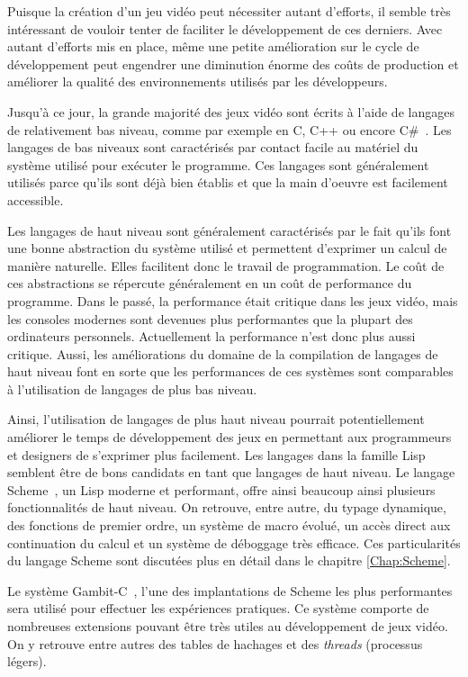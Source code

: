 \documentclass[12pt,oneside,letterpaper,francais]{book}
\begin{document}
Puisque la création d'un jeu vidéo peut nécessiter autant d'efforts,
il semble très intéressant de vouloir tenter de faciliter le
développement de ces derniers. Avec autant d'efforts mis en place,
même une petite amélioration sur le cycle de développement peut
engendrer une diminution énorme des coûts de production et améliorer
la qualité des environnements utilisés par les développeurs.

Jusqu'à ce jour, la grande majorité des jeux vidéo sont écrits à
l'aide de langages de relativement bas niveau, comme par exemple en C,
C++ ou encore C\#~\cite{CSHARP_SPEC}. Les langages de bas niveaux sont
caractérisés par contact facile au matériel du système utilisé pour
exécuter le programme. Ces langages sont généralement utilisés parce
qu'ils sont déjà bien établis et que la main d'oeuvre est facilement
accessible.

Les langages de haut niveau sont généralement caractérisés par le fait
qu'ils font une bonne abstraction du système utilisé et permettent
d'exprimer un calcul de manière naturelle. Elles facilitent donc le
travail de programmation. Le coût de ces abstractions se répercute
généralement en un coût de performance du programme. Dans le passé, la
performance était critique dans les jeux vidéo, mais les consoles
modernes sont devenues plus performantes que la plupart des
ordinateurs personnels. Actuellement la performance n'est donc plus
aussi critique. Aussi, les améliorations du domaine de la compilation
de langages de haut niveau font en sorte que les performances de ces
systèmes sont comparables à l'utilisation de langages de plus bas
niveau.

Ainsi, l'utilisation de langages de plus haut niveau pourrait
potentiellement améliorer le temps de développement des jeux en
permettant aux programmeurs et designers de s'exprimer plus
facilement. Les langages dans la famille Lisp semblent être de bons
candidats en tant que langages de haut niveau. Le langage
Scheme~\cite{R5RS}, un Lisp moderne et performant, offre ainsi
beaucoup ainsi plusieurs fonctionnalités de haut niveau. On retrouve,
entre autre, du typage dynamique, des fonctions de premier ordre, un
système de macro évolué, un accès direct aux continuation du calcul et
un système de déboggage très efficace. Ces particularités du langage
Scheme sont discutées plus en détail dans le chapitre
\ref{Chap:Scheme}.

Le système Gambit-C~\cite{Gambit4}, l'une des implantations de Scheme
les plus performantes~\cite{GAMBIT_BENCHMARKS} sera utilisé pour
effectuer les expériences pratiques. Ce système comporte de nombreuses
extensions pouvant être très utiles au développement de jeux vidéo. On
y retrouve entre autres des tables de hachages et des \textit{threads}
(processus légers).
\end{document}
